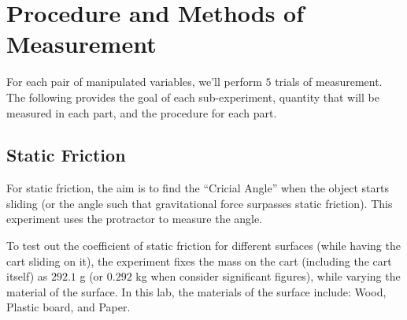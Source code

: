 \documentclass{article}
\begin{document}

\pagebreak

\section{Procedure and Methods of Measurement}
For each pair of manipulated variables, we'll perform $5$ trials of measurement. The following provides the goal of each sub-experiment, quantity that will be measured in each part, and the procedure for each part.

\subsection{Static Friction}
For static friction, the aim is to find the ``Cricial Angle'' when the object starts sliding (or the angle such that gravitational force surpasses static friction).  This experiment uses the protractor to measure the angle.

To test out the coefficient of static friction for different surfaces (while having the cart sliding on it), the experiment fixes the mass on the cart (including the cart itself) as $292.1$ g (or $0.292$ kg when consider significant figures), while varying the material of the surface. In this lab, the materials of the surface include: Wood, Plastic board, and Paper.
\end{document}
